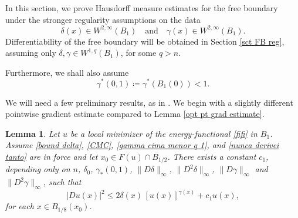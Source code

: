 \documentclass[reqno,11pt]{amsart}
\newtheorem{lemma}{Lemma}[section]
\newcommand{\1}{\mathds{1}}
\numberwithin{equation}{section}
\begin{document}
In this section, we prove Hausdorff measure estimates for the free boundary under the stronger regularity assumptions on the data
\begin{equation}\label{nunca derivei tanto}
    \delta(x) \in W^{2,\infty}(B_1) \quad \text{and} \quad \gamma(x) \in W^{2,\infty}(B_1).
\end{equation}
Differentiability of the free boundary will be obtained in Section \ref{sct FB reg}, assuming only $\delta, \gamma \in W^{1,q}(B_1)$, for some $q>n$.

Furthermore, we shall also assume
\begin{equation}\label{gamma cima menor q 1}
        \gamma^\ast(0,1) \coloneqq \gamma^\ast(B_1(0)) < 1.
\end{equation}

We will need a few preliminary results, as in \cite{AP}. We begin with a slightly different pointwise gradient estimate compared to Lemma \ref{opt pt grad estimate}.

\begin{lemma}\label{slightly dif pt grad est}
Let $u$ be a local minimizer of the energy-functional \eqref{fifi} in $B_1$. Assume \eqref{bound delta}, \eqref{CMC}, \eqref{gamma cima menor q 1}, and \eqref{nunca derivei tanto} are in force and let $x_0 \in F(u) \cap B_{1/2}$. There exists a constant $c_1$, depending only on $n$, $\delta_0$, $\gamma_\ast (0,1)$, $\|D\delta\|_\infty$, $\|D^2\delta\|_\infty$, $\|D\gamma\|_\infty$ and $\|D^2\gamma\|_\infty$, such that
$$
    |Du (x)|^2 \leq 2\delta(x)\,[u(x)]^{\gamma(x)} + c_1u(x),
$$
for each $x \in B_{1/8} (x_0)$.
\end{lemma}
\end{document}
